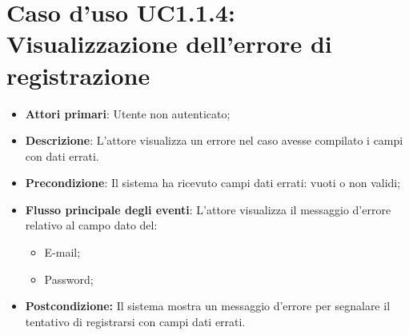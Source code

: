 \section{Caso d'uso UC1.1.4: Visualizzazione dell'errore di registrazione}
\begin{itemize}
	\item \textbf{Attori primari}: Utente non autenticato;
	\item \textbf{Descrizione}: L'attore visualizza un errore nel caso avesse compilato i campi con dati errati.
	\item \textbf{Precondizione}: Il sistema ha ricevuto campi dati errati: vuoti o non validi;
	\item \textbf{Flusso principale degli eventi}: L'attore visualizza il messaggio d'errore relativo al campo dato del:
	\begin{itemize}
		\item E-mail;
		\item Password;
	\end{itemize}
	\item \textbf{Postcondizione:} Il sistema mostra un messaggio d'errore per segnalare il tentativo di registrarsi con campi dati errati.
\end{itemize}

